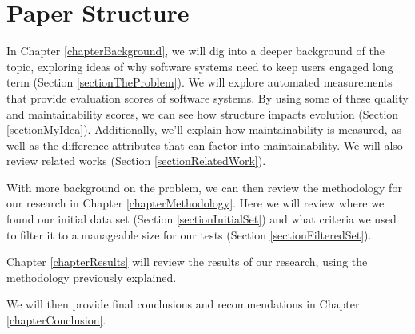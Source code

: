 \section{Paper Structure}


In Chapter \ref{chapterBackground}, we will dig into a deeper background of the topic, exploring ideas of why software systems need to keep users engaged long term (Section \ref{sectionTheProblem}). We will explore automated measurements that provide evaluation scores of software systems. By using some of these quality and maintainability scores, we can see how structure impacts evolution (Section \ref{sectionMyIdea}). Additionally, we'll explain how maintainability is measured, as well as the difference attributes that can factor into maintainability. We will also review related works (Section \ref{sectionRelatedWork}).


With more background on the problem, we can then review the methodology for our research in Chapter \ref{chapterMethodology}. Here we will review where we found our initial data set (Section \ref{sectionInitialSet}) and what criteria we used to filter it to a manageable size for our tests (Section \ref{sectionFilteredSet}).


Chapter \ref{chapterResults} will review the results of our research, using the methodology previously explained.


We will then provide final conclusions and recommendations in Chapter \ref{chapterConclusion}.
